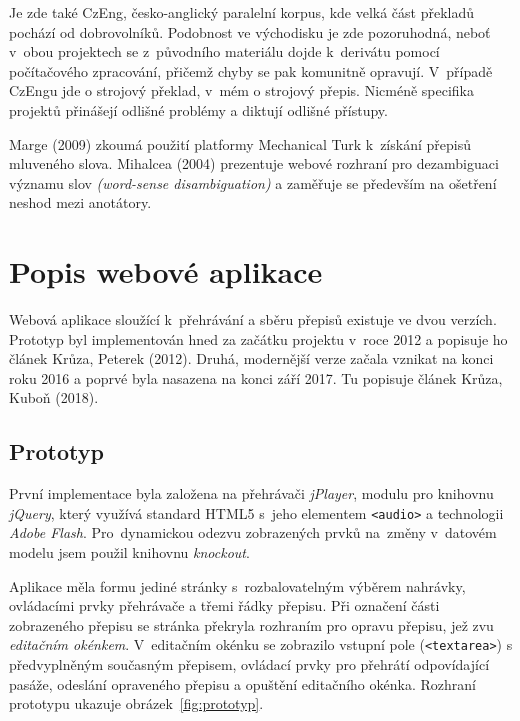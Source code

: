 Je zde také CzEng\cite{bojar2008czeng}, česko-anglický paralelní korpus, kde
velká část překladů pochází od dobrovolníků. Podobnost ve východisku je zde
pozoruhodná, neboť v~obou projektech se z~původního materiálu dojde k~derivátu
pomocí počítačového zpracování, přičemž chyby se pak komunitně opravují.
V~případě CzEngu jde o strojový překlad, v~mém o strojový přepis. Nicméně
specifika projektů přinášejí odlišné problémy a diktují odlišné přístupy.

Marge (2009)\cite{5494979} zkoumá použití platformy Mechanical Turk k~získání
přepisů mluveného slova. Mihalcea (2004)\cite{mihalcea2004building} prezentuje
webové rozhraní pro dezambiguaci významu slov {\em (word-sense disambiguation)} a
zaměřuje se především na ošetření neshod mezi anotátory.

\section{Popis webové aplikace}

Webová aplikace sloužící k~přehrávání a sběru přepisů existuje ve dvou
verzích. Prototyp byl implementován hned za začátku projektu v~roce
2012 a popisuje ho článek Krůza, Peterek (2012)\cite{kruuza2012making}. Druhá,
modernější verze začala vznikat na konci roku 2016 a poprvé byla nasazena na
konci září 2017. Tu popisuje článek Krůza, Kuboň
(2018)\cite{biblio:KrKuSecondGenerationWeb2018}.

\subsection{Prototyp}

První implementace byla založena na přehrávači \textit{jPlayer}, modulu pro
knihovnu \textit{jQuery}, který využívá standard HTML5 s~jeho elementem
\texttt{<audio>} a technologii \textit{Adobe Flash}. Pro~dynamickou odezvu
zobrazených prvků na~změny v~datovém modelu jsem použil knihovnu
\textit{knockout}.

Aplikace měla formu jediné stránky s~rozbalovatelným výběrem nahrávky,
ovládacími prvky přehrávače a třemi řádky přepisu. Při označení části
zobrazeného přepisu se stránka překryla rozhraním pro opravu přepisu, jež zvu
\textit{editačním okénkem}. V~editačním okénku se zobrazilo vstupní pole
(\texttt{<textarea>}) s předvyplněným současným přepisem, ovládací prvky pro
přehrátí odpovídající pasáže, odeslání opraveného přepisu a opuštění editačního
okénka.
Rozhraní prototypu ukazuje obrázek~\ref{fig:prototyp}.


